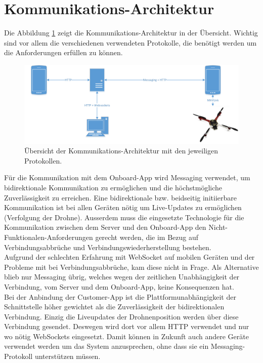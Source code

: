 {\section{Kommunikations-Architektur}
\label{sec:communication-architecture}

Die Abbildung \ref{fig:communication-architecture-overview} zeigt die Kommunikations-Architektur in der Übersicht.
Wichtig sind vor allem die verschiedenen verwendeten Protokolle, die benötigt werden um die Anforderungen erfüllen zu können. \\

\begin{figure}[H]
	\includegraphics[width=1.0\textwidth]{images/Communication-Overview-Diagram.pdf}
	\caption{Übersicht der Kommunikations-Architektur mit den jeweiligen Protokollen. }
	\label{fig:communication-architecture-overview}
\end{figure}


Für die Kommunikation mit dem Onboard-App wird Messaging verwendet, um bidirektionale Kommunikation zu ermöglichen und die höchstmögliche Zuverlässigkeit zu erreichen.
Eine bidirektionale bzw. beidseitig initiierbare Kommunikation ist bei allen Geräten nötig um Live-Updates zu ermöglichen (Verfolgung der Drohne).
Ausserdem muss die eingesetzte Technologie für die Kommunikation zwischen dem Server und den Onboard-App den Nicht-Funktionalen-Anforderungen gerecht werden, die im Bezug auf Verbindungsabbrüche und Verbindungswiederherstellung bestehen.\\

Aufgrund der schlechten Erfahrung mit WebSocket auf mobilen Geräten und der Probleme mit bei Verbindungsabbrüche, kam diese nicht in Frage. Als Alternative blieb nur Messaging übrig, welches wegen der zeitlichen Unabhängigkeit der Verbindung, vom Server und dem Onboard-App, keine Konsequenzen hat. \\

	
Bei der Anbindung der Customer-App ist die Plattformunabhängigkeit der Schnittstelle höher gewichtet als die Zuverlässigkeit der bidirektionalen Verbindung. Einzig die Liveupdates der Drohnenposition werden über diese Verbindung gesendet. Deswegen wird dort vor allem HTTP verwendet und nur wo nötig WebSockets eingesetzt. Damit können in Zukunft auch andere Geräte verwendet werden um das System anzusprechen, ohne dass sie ein Messaging-Protokoll unterstützen müssen.\\

}
